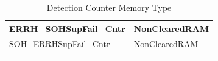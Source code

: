 \begin{longtable}{|l|l|}
\begin{minipage}{0.47\linewidth}\raggedright\vspace{.75ex}ERRH\_SOHSupFail\_Cntr\vspace{.75ex}\end{minipage} & \begin{minipage}{0.47\linewidth}\raggedright\vspace{.75ex}NonClearedRAM\vspace{.75ex}\end{minipage}\\\hline
\begin{minipage}{0.47\linewidth}\raggedright\vspace{.75ex}SOH\_ERRHSupFail\_Cntr\vspace{.75ex}\end{minipage} & \begin{minipage}{0.47\linewidth}\raggedright\vspace{.75ex}NonClearedRAM\vspace{.75ex}\end{minipage}\\\hline
\caption{\label{table:detCounterMemType}Detection Counter Memory Type}
\end{longtable}